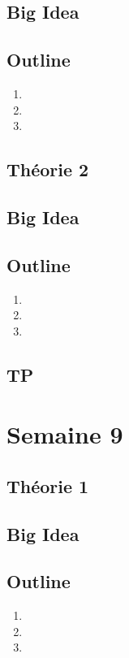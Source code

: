 \documentclass{article}
\begin{document}
\subsection*{Big Idea}
\subsection*{Outline}
\begin{enumerate}
    \item
    \item
    \item
\end{enumerate}
\subsection{Théorie 2}
\subsection*{Big Idea}
\subsection*{Outline}
\begin{enumerate}
    \item
    \item
    \item
\end{enumerate}
\subsection{TP}

\pagebreak
\section{Semaine 9}
\subsection{Théorie 1}
\subsection*{Big Idea}
\subsection*{Outline}
\begin{enumerate}
    \item
    \item
    \item
\end{enumerate}
\end{document}
